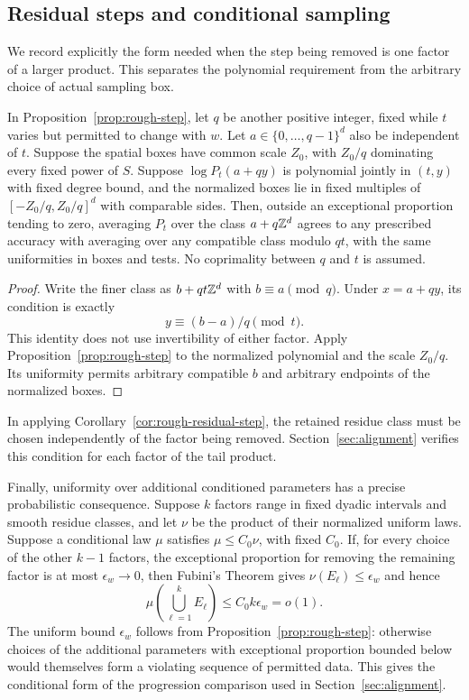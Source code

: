 \subsection{Residual steps and conditional sampling}

We record explicitly the form needed when the step being removed is
one factor of a larger product.  This separates the polynomial
requirement from the arbitrary choice of actual sampling box.

\begin{corollary}
\label{cor:rough-residual-step}
In Proposition~\ref{prop:rough-step}, let $q$ be another positive
integer, fixed while $t$ varies but permitted to change with $w$.
Let $a\in\{0,\ldots,q-1\}^d$ also be independent of $t$.
Suppose the spatial boxes have common scale $Z_0$, with
$Z_0/q$ dominating every fixed power of $S$.  Suppose
$\log P_t(a+qy)$ is polynomial jointly in $(t,y)$ with fixed degree
bound, and the normalized boxes lie in fixed multiples of
$[-Z_0/q,Z_0/q]^d$ with comparable sides.  Then, outside an exceptional
proportion tending to zero, averaging $P_t$ over the class
$a+q\mathbb Z^d$ agrees to any prescribed accuracy with averaging over any
compatible class modulo $qt$, with the same uniformities in boxes and
tests.  No coprimality between $q$ and $t$ is assumed.
\end{corollary}

\begin{proof}
Write the finer class as $b+qt\mathbb Z^d$ with $b\equiv a\pmod q$.
Under $x=a+qy$, its condition is exactly
\[
 y\equiv(b-a)/q\pmod t.
\]
This identity does not use invertibility of either factor.  Apply
Proposition~\ref{prop:rough-step} to the normalized polynomial and
the scale $Z_0/q$.  Its uniformity permits arbitrary compatible $b$
and arbitrary endpoints of the normalized boxes.
\end{proof}

In applying Corollary~\ref{cor:rough-residual-step}, the retained residue
class must be chosen independently of the factor being removed.
Section~\ref{sec:alignment} verifies this condition for each factor of
the tail product.

Finally, uniformity over additional conditioned parameters has a
precise probabilistic consequence.  Suppose $k$ factors range in fixed
dyadic intervals and smooth residue classes, and let $\nu$ be the
product of their normalized uniform laws.  Suppose a conditional law
$\mu$ satisfies $\mu\leq C_0\nu$, with fixed $C_0$.  If, for every
choice of the other $k-1$ factors, the exceptional proportion for
removing the remaining factor is at most $\epsilon_w\to0$, then
Fubini's Theorem gives $\nu(E_\ell)\leq\epsilon_w$ and hence
\[
 \mu\left(\bigcup_{\ell=1}^k E_\ell\right)
       \leq C_0k\epsilon_w=o(1).
\]
The uniform bound $\epsilon_w$ follows from
Proposition~\ref{prop:rough-step}: otherwise choices of the additional
parameters with exceptional proportion bounded below would themselves
form a violating sequence of permitted data.  This gives the conditional
form of the progression comparison used in Section~\ref{sec:alignment}.
